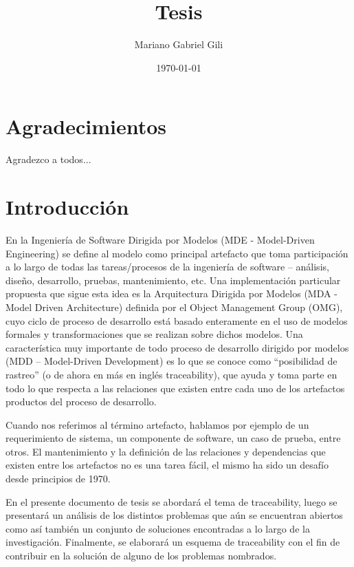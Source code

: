 \documentclass[a4paper,12pt,oneside]{book}
\author{Mariano Gabriel Gili}
\title{Tesis}
\date{\today}
\begin{document}
 \maketitle

\frontmatter
\tableofcontents
\listoffigures


\chapter{Agradecimientos}


Agradezco a todos...


\chapter{Introducción}


En la Ingeniería de Software Dirigida por Modelos (MDE - Model-Driven Engineering) se define al modelo como principal artefacto que toma participación a lo largo de todas las tareas/procesos de la ingeniería de software – análisis, diseño, desarrollo, pruebas, mantenimiento, etc. Una implementación particular propuesta  que sigue esta idea es la Arquitectura Dirigida por Modelos (MDA - Model Driven Architecture) definida por el Object Management Group (OMG), cuyo ciclo de proceso de desarrollo está basado enteramente en el uso de modelos formales y transformaciones que se realizan sobre dichos modelos. Una característica muy importante de todo proceso de desarrollo dirigido por modelos (MDD – Model-Driven Development) es lo que se conoce como “posibilidad de rastreo” (o de ahora en más en inglés traceability), que ayuda y toma parte en todo lo que respecta a las relaciones que existen entre cada uno de los artefactos productos del proceso de desarrollo.

Cuando nos referimos al término artefacto, hablamos por ejemplo de un requerimiento de sistema, un componente de software, un caso de prueba, entre otros. El mantenimiento y la definición de las relaciones y dependencias que existen entre los artefactos no es una tarea fácil, el mismo ha sido un desafío desde principios de 1970.

En el presente documento de tesis se abordará el tema de traceability, luego se presentará un análisis de los distintos problemas que aún se encuentran abiertos como así también un conjunto de soluciones encontradas a lo largo de la investigación. Finalmente, se elaborará un esquema de traceability con el fin de contribuir en la solución de alguno de los problemas nombrados.
\end{document}
